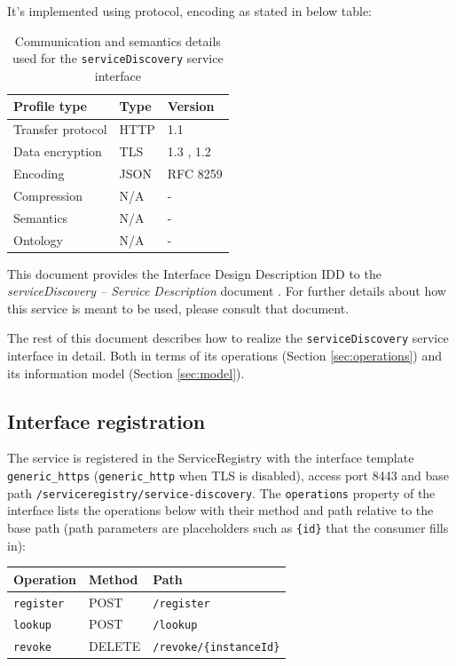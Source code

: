 \documentclass[a4paper]{arrowhead}
\begin{document}
It's implemented using protocol, encoding as stated in below table:
\begin{table}[ht!]
  \centering
  \begin{tabular}{|l|l|l|}
    \hline
    \rowcolor{gray!33} Profile type & Type & Version \\ \hline
    Transfer protocol & HTTP & 1.1 \cite{rfc9112} \\ \hline
    Data encryption & TLS & 1.3 \cite{rfc8446}, 1.2 \cite{rfc5246} \\ \hline
    Encoding & JSON & RFC 8259 \cite{rfc8259} \\ \hline
    Compression & N/A & - \\ \hline
    Semantics & N/A & - \\ \hline
    Ontology & N/A & - \\ \hline
  \end{tabular}
  \caption{Communication and semantics details used for the \texttt{serviceDiscovery} service interface}
  \label{tab:comunication_semantics_profile}
\end{table}

This document provides the Interface Design Description IDD to the \textit{serviceDiscovery -- Service Description} document \cite{sr-serviceDiscovery-sd}.
For further details about how this service is meant to be used, please consult that document.

The rest of this document describes how to realize the \texttt{serviceDiscovery} service
interface in detail. Both in terms of its operations (Section \ref{sec:operations}) and its information model (Section \ref{sec:model}).

\subsection{Interface registration}

The service is registered in the ServiceRegistry with the interface template \texttt{generic\_\allowbreak{}https} (\texttt{generic\_\allowbreak{}http} when TLS is disabled), access port 8443 and base path \texttt{/\allowbreak{}serviceregistry/\allowbreak{}service-\allowbreak{}discovery}. The \texttt{operations} property of the interface lists the operations below with their method and path relative to the base path (path parameters are placeholders such as \texttt{\{id\}} that the consumer fills in):

\noindent\begin{longtable}{| p{5.2cm} | p{1.6cm} | p{8.4cm} |} \hline
\rowcolor{gray!33} Operation & Method & Path \\ \hline \endhead
\texttt{register} & POST & \texttt{/\allowbreak{}register} \\ \hline
\texttt{lookup} & POST & \texttt{/\allowbreak{}lookup} \\ \hline
\texttt{revoke} & DELETE & \texttt{/\allowbreak{}revoke/\allowbreak{}\{instance\allowbreak{}Id\}} \\ \hline
\end{longtable}
\end{document}
